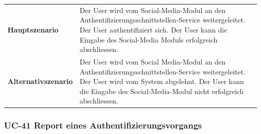 \begin{longtable}[c]{@{}ll@{}}
\begin{minipage}[t]{0.34\columnwidth}
\textbf{Hauptszenario}
\strut\end{minipage} &
\begin{minipage}[t]{0.60\columnwidth}\raggedright\strut
Der User wird vom Social-Media-Modul an den
Authentifizierungsschnittstellen-Service weitergeleitet. Der User
authentifiziert sich. Der User kann die Eingabe des Social-Media Moduls
erfolgreich abschliessen.
\strut\end{minipage}\tabularnewline
\begin{minipage}[t]{0.34\columnwidth}\raggedright\strut
\textbf{Alternativszenario}
\strut\end{minipage} &
\begin{minipage}[t]{0.60\columnwidth}\raggedright\strut
Der User wird vom Social Media-Modul an den
Authentifizierungsschnittstellen-Service weitergeleitet. Der User wird
vom System abgelehnt. Der User kann die Eingabe des Social-Media-Modul
nicht erfolgreich abschliessen.
\strut\end{minipage}\tabularnewline
\bottomrule
\end{longtable}

\subsubsection{UC-41 Report eines
Authentifizierungsvorgangs}\label{uc-41-report-eines-authentifizierungsvorgangs}

